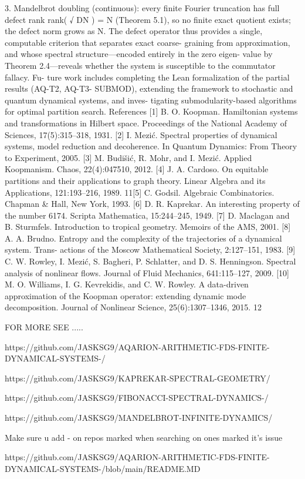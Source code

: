 3. Mandelbrot doubling (continuous): every finite Fourier truncation has full defect rank
rank(
√
DN ) = N (Theorem 5.1), so no finite exact quotient exists; the defect norm grows as
N.
The defect operator thus provides a single, computable criterion that separates exact coarse-
graining from approximation, and whose spectral structure—encoded entirely in the zero eigen-
value by Theorem 2.4—reveals whether the system is susceptible to the commutator fallacy. Fu-
ture work includes completing the Lean formalization of the partial results (AQ-T2, AQ-T3-
SUBMOD), extending the framework to stochastic and quantum dynamical systems, and inves-
tigating submodularity-based algorithms for optimal partition search.
References
[1] B. O. Koopman. Hamiltonian systems and transformations in Hilbert space. Proceedings of
the National Academy of Sciences, 17(5):315–318, 1931.
[2] I. Mezić. Spectral properties of dynamical systems, model reduction and decoherence. In
Quantum Dynamics: From Theory to Experiment, 2005.
[3] M. Budišić, R. Mohr, and I. Mezić. Applied Koopmanism. Chaos, 22(4):047510, 2012.
[4] J. A. Cardoso. On equitable partitions and their applications to graph theory. Linear Algebra
and its Applications, 121:193–216, 1989.
11[5] C. Godsil. Algebraic Combinatorics. Chapman & Hall, New York, 1993.
[6] D. R. Kaprekar. An interesting property of the number 6174. Scripta Mathematica, 15:244–245,
1949.
[7] D. Maclagan and B. Sturmfels. Introduction to tropical geometry. Memoirs of the AMS, 2001.
[8] A. A. Brudno. Entropy and the complexity of the trajectories of a dynamical system. Trans-
actions of the Moscow Mathematical Society, 2:127–151, 1983.
[9] C. W. Rowley, I. Mezić, S. Bagheri, P. Schlatter, and D. S. Henningson. Spectral analysis of
nonlinear flows. Journal of Fluid Mechanics, 641:115–127, 2009.
[10] M. O. Williams, I. G. Kevrekidis, and C. W. Rowley. A data-driven approximation of the
Koopman operator: extending dynamic mode decomposition. Journal of Nonlinear Science,
25(6):1307–1346, 2015.
12

FOR MORE SEE .....

https://github.com/JASKSG9/AQARION-ARITHMETIC-FDS-FINITE-DYNAMICAL-SYSTEMS-/

https://github.com/JASKSG9/KAPREKAR-SPECTRAL-GEOMETRY/

https://github.com/JASKSG9/FIBONACCI-SPECTRAL-DYNAMICS-/

https://github.com/JASKSG9/MANDELBROT-INFINITE-DYNAMICS/

Make sure u add -  on repos marked when searching on ones marked it's issue

https://github.com/JASKSG9/AQARION-ARITHMETIC-FDS-FINITE-DYNAMICAL-SYSTEMS-/blob/main/README.MD
